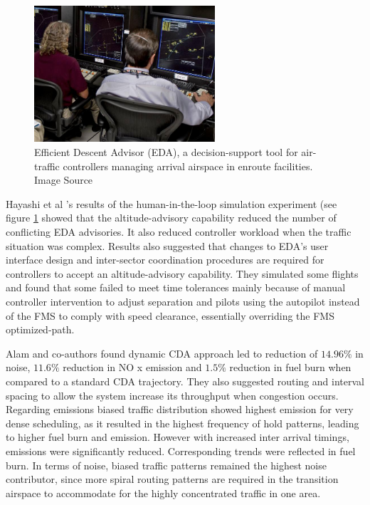 \documentclass{aer1315-pretty}
\begin{document}
\begin{figure}[!h]
\centering
\includegraphics[width=0.6\textwidth]{figures/EDA.jpg}
	\caption{Efficient Descent Advisor (EDA), a decision-support tool for air-traffic controllers managing arrival airspace in enroute facilities. Image Source \cite{Copp:2010b}}	
	\label{fig:EDA}
\end{figure}


Hayashi et al \cite{Hayashi:2011} 's results of the human-in-the-loop simulation experiment (see figure \ref{fig:EDA} showed that the altitude-advisory capability reduced the number of conflicting EDA advisories. It also reduced controller workload when the traffic situation was complex. Results also suggested that changes to EDA’s user interface design and inter-sector coordination procedures are required for controllers to accept an altitude-advisory capability. They simulated some flights and found that some failed to meet time tolerances mainly because of manual controller intervention to adjust separation and pilots using the autopilot instead of the FMS to comply with speed clearance, essentially overriding the FMS optimized-path. \par


Alam and co-authors \cite{Alam:2010} found dynamic CDA approach led to reduction of $14.96\%$ in noise, $11.6\%$ reduction in NO x emission and $1.5\%$ reduction in fuel burn when compared to a standard CDA trajectory. They also suggested
routing and interval spacing to allow the system increase its throughput when congestion occurs. Regarding emissions biased traffic distribution showed highest emission for very dense scheduling, as it resulted in the highest frequency of hold patterns, leading to higher fuel burn and emission. However with increased inter arrival timings, emissions were significantly reduced. Corresponding trends were reflected in fuel burn. In terms of noise, biased traffic patterns remained the highest noise contributor, since more spiral routing patterns are required in the transition airspace to accommodate for the highly concentrated traffic in one area. \par
\end{document}
